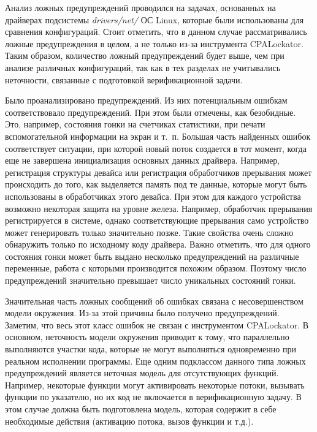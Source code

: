 Анализ ложных предупреждений проводился на задачах, основанных на драйверах подсистемы \textit{drivers/net/} ОС Linux, которые были использованы для сравнения конфигураций.
Стоит отметить, что в данном случае рассматривались ложные предупреждения в целом, а не только из-за инструмента CPALockator.
Таким образом, количество ложный предупреждений будет выше, чем при анализе различных конфигураций, так как в тех разделах не учитывались неточности, связанные с подготовкой верификационной задачи.

Было проанализировано  предупреждений.
Из них потенциальным ошибкам соответствовало  предупреждений.
При этом  были отмечены, как безобидные. 
Это, например, состояния гонки на счетчиках статистики, при печати вспомогательной информации на экран и т.~п.
Большая часть найденных ошибок соответствует ситуации, при которой новый поток создается в тот момент, когда еще не завершена инициализация основных данных драйвера.
Например, регистрация структуры девайса или регистрация обработчиков прерывания может происходить до того, как выделяется память под те данные, которые могут быть использованы в обработчиках этого девайса. 
При этом для каждого устройства возможно некоторая защита на уровне железа. 
Например, обработчик прерывания регистрируется в системе, однако соответствующие прерывания само устройство может генерировать только значительно позже.
Такие свойства очень сложно обнаружить только по исходному коду драйвера.
Важно отметить, что для одного состояния гонки может быть выдано несколько предупреждений на различные переменные, работа с которыми производится похожим образом.
Поэтому число предупреждений значительно превышает число уникальных состояний гонки.

Значительная часть ложных сообщений об ошибках связана с несовершенством модели окружения.
Из-за этой причины было получено  предупреждений.
Заметим, что весь этот класс ошибок не связан с инструментом CPALockator.
В основном, неточность модели окружения приводит к тому, что параллельно выполняются участки кода, которые не могут выполняться одновременно при реальном исполнении программы.
Еще одним подклассом данного типа ложных предупреждений является неточная модель для отсутствующих функций.
Например, некоторые функции могут активировать некоторые потоки, вызывать функции по указателю, но их код не включается в верификационную задачу.
В этом случае должна быть подготовлена модель, которая содержит в себе необходимые действия (активацию потока, вызов функции и т.д.). 

